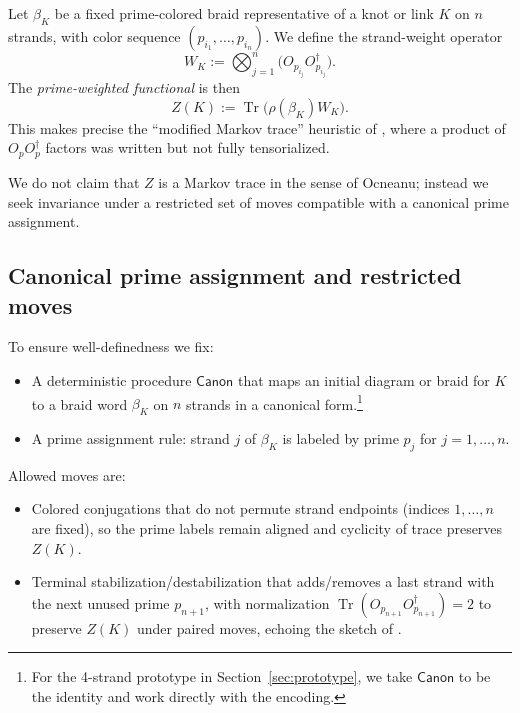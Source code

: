 \documentclass[11pt]{article}
\begin{document}
Let $\beta_K$ be a fixed prime-colored braid representative of a knot or link $K$ on $n$ strands, with color sequence $(p_{i_1},\dots,p_{i_n})$. We define the strand-weight operator
\begin{equation}
  W_K := \bigotimes_{j=1}^n \big(O_{p_{i_j}} O_{p_{i_j}}^\dagger\big).
  \label{eq:W-K}
\end{equation}
The \emph{prime-weighted functional} is then
\begin{equation}
  Z(K) := \operatorname{Tr}\big(\rho(\beta_K) W_K\big).
  \label{eq:Z-K}
\end{equation}
This makes precise the ``modified Markov trace'' heuristic of \cite[Eq.~(6)]{MTv21}, where a product of $O_p O_p^\dagger$ factors was written but not fully tensorialized.

We do not claim that $Z$ is a Markov trace in the sense of Ocneanu; instead we seek invariance under a restricted set of moves compatible with a canonical prime assignment.

\subsection{Canonical prime assignment and restricted moves}

To ensure well-definedness we fix:

\begin{itemize}
  \item A deterministic procedure $\mathsf{Canon}$ that maps an initial diagram or braid for $K$ to a braid word $\beta_K$ on $n$ strands in a canonical form.\footnote{For the 4-strand prototype in Section~\ref{sec:prototype}, we take $\mathsf{Canon}$ to be the identity and work directly with the encoding.}
  \item A prime assignment rule: strand $j$ of $\beta_K$ is labeled by prime $p_j$ for $j=1,\dots,n$.
\end{itemize}

Allowed moves are:

\begin{itemize}
  \item Colored conjugations that do not permute strand endpoints (indices $1,\dots,n$ are fixed), so the prime labels remain aligned and cyclicity of trace preserves $Z(K)$.
  \item Terminal stabilization/destabilization that adds/removes a last strand with the next unused prime $p_{n+1}$, with normalization $\operatorname{Tr}(O_{p_{n+1}} O_{p_{n+1}}^\dagger) = 2$ to preserve $Z(K)$ under paired moves, echoing the sketch of \cite[Thm.~2.1]{MTv21}.
\end{itemize}
\end{document}
